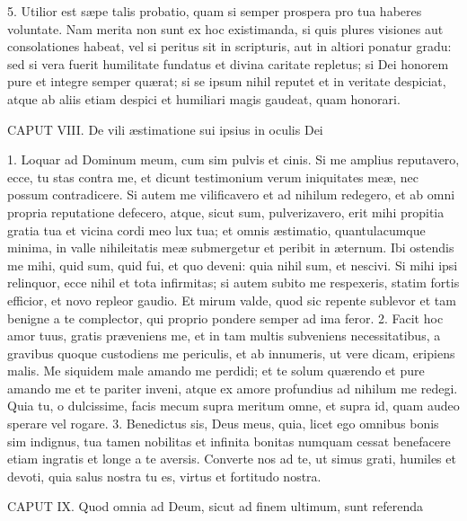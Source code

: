 \documentclass[twoside]{article}
\begin{document}
5. Utilior est sæpe talis probatio, quam si semper prospera pro tua haberes voluntate. Nam merita non sunt ex hoc existimanda, si quis plures visiones aut consolationes habeat, vel si peritus sit in scripturis, aut in altiori ponatur gradu: sed si vera fuerit humilitate fundatus et divina caritate repletus; si Dei honorem pure et integre semper quærat; si se ipsum nihil reputet et in veritate despiciat, atque ab aliis etiam despici et humiliari magis gaudeat, quam honorari.


CAPUT VIII.
De vili æstimatione sui ipsius in oculis Dei

1. Loquar ad Dominum meum, cum sim pulvis et cinis. Si me amplius reputavero, ecce, tu stas contra me, et dicunt testimonium verum iniquitates meæ, nec possum contradicere. Si autem me vilificavero et ad nihilum redegero, et ab omni propria reputatione defecero, atque, sicut sum, pulverizavero, erit mihi propitia gratia tua et vicina cordi meo lux tua; et omnis æstimatio, quantulacumque minima, in valle nihileitatis meæ submergetur et peribit in æternum. Ibi ostendis me mihi, quid sum, quid fui, et quo deveni: quia nihil sum, et nescivi. Si mihi ipsi relinquor, ecce nihil et tota infirmitas; si autem subito me respexeris, statim fortis efficior, et novo repleor gaudio. Et mirum valde, quod sic repente sublevor et tam benigne a te complector, qui proprio pondere semper ad ima feror.
2. Facit hoc amor tuus, gratis præveniens me, et in tam multis subveniens necessitatibus, a gravibus quoque custodiens me periculis, et ab innumeris, ut vere dicam, eripiens malis. Me siquidem male amando me perdidi; et te solum quærendo et pure amando me et te pariter inveni, atque ex amore profundius ad nihilum me redegi. Quia tu, o dulcissime, facis mecum supra meritum omne, et supra id, quam audeo sperare vel rogare.
3. Benedictus sis, Deus meus, quia, licet ego omnibus bonis sim indignus, tua tamen nobilitas et infinita bonitas numquam cessat benefacere etiam ingratis et longe a te aversis. Converte nos ad te, ut simus grati, humiles et devoti, quia salus nostra tu es, virtus et fortitudo nostra.


CAPUT IX.
Quod omnia ad Deum, sicut ad finem ultimum, sunt referenda
\end{document}
